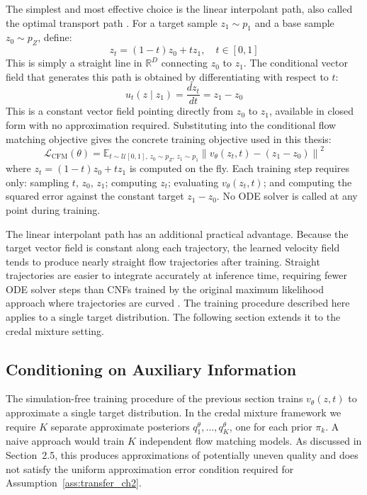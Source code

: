     The simplest and most effective choice is the linear interpolant path, also called the optimal transport path \citep{lipman2022;liu2022}. For a target sample $z_1 \sim p_1$ and a base sample $z_0 \sim p_Z$, define:
    \begin{equation}
        z_t = (1 - t) z_0 + t z_1, \quad t \in [0, 1]
        \label{eq:linear_interp}
    \end{equation}
    This is simply a straight line in $\mathbb{R}^D$ connecting $z_0$ to $z_1$. The conditional vector field that generates this path is obtained by differentiating with respect to $t$:
    \begin{equation}
        u_t(z \mid z_1) = \frac{d z_t}{dt} = z_1 - z_0
    \end{equation}
    This is a constant vector field pointing directly from $z_0$ to $z_1$, available in closed form with no approximation required. Substituting into the conditional flow matching objective gives the concrete training objective used in this thesis:
    \begin{equation}
        \mathcal{L}_\text{CFM}(\theta) = \mathbb{E}_{t \sim \mathcal{U}[0,1],\, z_0 \sim p_Z,\, z_1 \sim p_1} \left\| v_\theta(z_t, t) - (z_1 - z_0) \right\|^2
        \label{eq:cfm_linear}
    \end{equation}
    where $z_t = (1-t)z_0 + t z_1$ is computed on the fly. Each training step requires only: sampling $t$, $z_0$, $z_1$; computing $z_t$; evaluating $v_\theta(z_t, t)$; and computing the squared error against the constant target $z_1 - z_0$. No ODE solver is called at any point during training.

    The linear interpolant path has an additional practical advantage. Because the target vector field is constant along each trajectory, the learned velocity field tends to produce nearly straight flow trajectories after training. Straight trajectories are easier to integrate accurately at inference time, requiring fewer ODE solver steps than CNFs trained by the original maximum likelihood approach where trajectories are curved \citep{liu2022}. The training procedure described here applies to a single target distribution. The following section extends it to the credal mixture setting.

    \subsection{Conditioning on Auxiliary Information}

    The simulation-free training procedure of the previous section trains $v_\theta(z, t)$ to approximate a single target distribution. In the credal mixture framework we require $K$ separate approximate posteriors $q^\theta_1, \ldots, q^\theta_K$, one for each prior $\pi_k$. A naive approach would train $K$ independent flow matching models. As discussed in Section~2.5, this produces approximations of potentially uneven quality and does not satisfy the uniform approximation error condition required for Assumption~\ref{ass:transfer_ch2}.

